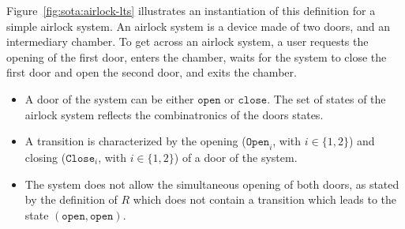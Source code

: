 \begin{example}
  \label{example:sota:airlocklts}
  Figure~\ref{fig:sota:airlock-lts} illustrates an instantiation of this
  definition for a simple airlock system.
  An airlock system is a device made of two doors, and an intermediary chamber.
  To get across an airlock system, a user requests the opening of the first door,
  enters the chamber, waits for the system to close the first door and open the
  second door, and exits the chamber.

  \begin{itemize}
  \item A door of the system can be either \( \mathtt{open} \) or
    \( \mathtt{close} \).
    The set of states of the airlock system reflects the combinatronics of the
    doors states.
  \item A transition is characterized by the opening (\( \mathtt{Open}_i\), with
    \( i \in \{1, 2\} \)) and closing (\( \mathtt{Close}_i \), with
    \( i \in \{1, 2\} \)) of a door of the system.
  \item The system does not allow the simultaneous opening of both doors, as
    stated by the definition of \( R \) which does not contain a transition
    which leads to the state \( (\mathtt{open}, \mathtt{open}) \).
  \end{itemize}
\end{example}

